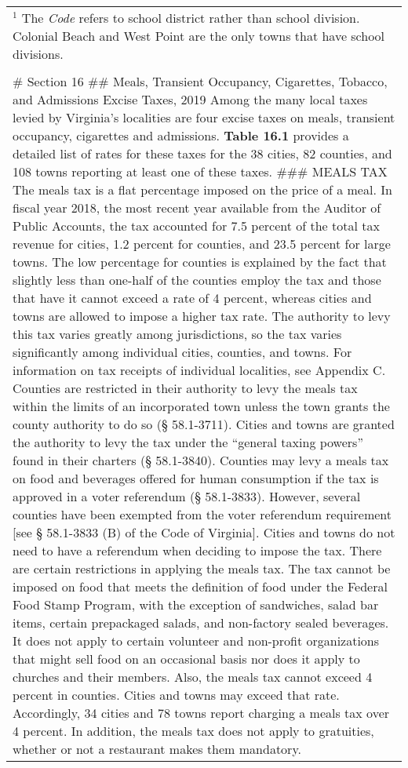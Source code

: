 \documentclass[
]{book}
\begin{document}
\begin{longtable}[]{@{}
  >{\raggedright\arraybackslash}p{}@{}}
\toprule
\endhead
\(^1\) The \emph{Code} refers to school district rather than school division. Colonial Beach and West Point are the only towns that have school divisions. \\
 \\
\# Section 16
\#\# Meals, Transient Occupancy, Cigarettes, Tobacco, and Admissions Excise Taxes, 2019
\textbar{} Among the many local taxes levied by Virginia's localities are four excise taxes on meals, transient occupancy, cigarettes and admissions. \textbf{Table 16.1} provides a detailed list of rates for these taxes for the 38 cities, 82 counties, and 108 towns reporting at least one of these taxes.
\textbar{}
\#\#\# MEALS TAX
\textbar{} The meals tax is a flat percentage imposed on the price of a meal. In fiscal year 2018, the most recent year available from the Auditor of Public Accounts, the tax accounted for 7.5 percent of the total tax revenue for cities, 1.2 percent for counties, and 23.5 percent for large towns. The low percentage for counties is explained by the fact that slightly less than one-half of the counties employ the tax and those that have it cannot exceed a rate of 4 percent, whereas cities and towns are allowed to impose a higher tax rate. The authority to levy this tax varies greatly among jurisdictions, so the tax varies significantly among individual cities, counties, and towns. For information on tax receipts of individual localities, see Appendix C.
\textbar{}
\textbar{} Counties are restricted in their authority to levy the meals tax within the limits of an incorporated town unless the town grants the county authority to do so (§ 58.1-3711). Cities and towns are granted the authority to levy the tax under the ``general taxing powers'' found in their charters (§ 58.1-3840).
\textbar{}
\textbar{} Counties may levy a meals tax on food and beverages offered for human consumption if the tax is approved in a voter referendum (§ 58.1-3833). However, several counties have been exempted from the voter referendum requirement {[}see § 58.1-3833 (B) of the Code of Virginia{]}. Cities and towns do not need to have a referendum when deciding to impose the tax.
\textbar{}
\textbar{} There are certain restrictions in applying the meals tax. The tax cannot be imposed on food that meets the definition of food under the Federal Food Stamp Program, with the exception of sandwiches, salad bar items, certain prepackaged salads, and non-factory sealed beverages. It does not apply to certain volunteer and non-profit organizations that might sell food on an occasional basis nor does it apply to churches and their members. Also, the meals tax cannot exceed 4 percent in counties. Cities and towns may exceed that rate. Accordingly, 34 cities and 78 towns report charging a meals tax over 4 percent. In addition, the meals tax does not apply to gratuities, whether or not a restaurant makes them mandatory.

\end{longtable}
\end{document}
